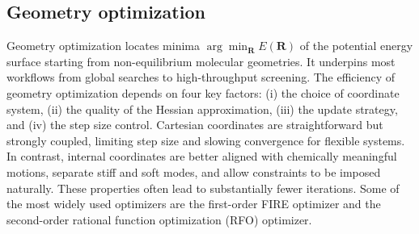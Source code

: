 \documentclass[pdflatex,sn-mathphys-num]{sn-jnl}%
\begin{document}
\subsection{Geometry optimization \label{sec:optimizerliterature}}
Geometry optimization locates minima $\arg\!\min_\mathbf{R} E(\mathbf{R})$ of the potential energy surface starting from non-equilibrium molecular geometries. It underpins most workflows from global searches\cite{christiansen2022,ronne2022} to high-throughput screening\cite{westermayr2023,ronne2024}. 
The efficiency of geometry optimization depends on four key factors: (i) the choice of coordinate system, (ii) the quality of the Hessian approximation, (iii) the update strategy, and (iv) the step size control. 
Cartesian coordinates are straightforward but strongly coupled, limiting step size and slowing convergence for flexible systems. In contrast, internal coordinates are better aligned with chemically meaningful motions, separate stiff and soft modes, and allow constraints to be imposed naturally. These properties often lead to substantially fewer iterations. 
Some of the most widely used optimizers are the first-order FIRE \citep{bitzek2006} optimizer and the second-order rational function optimization (RFO) optimizer.
\end{document}
